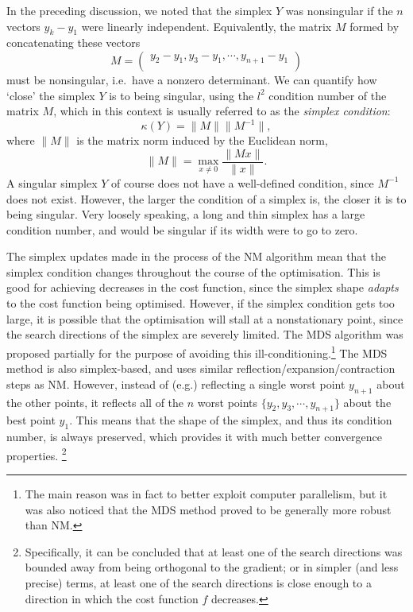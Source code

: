 In the preceding discussion, we noted that the simplex $Y$ was nonsingular if the $n$ vectors $y_k - y_1$ were linearly independent.
Equivalently, the matrix $M$ formed by concatenating these vectors
\begin{equation}
    \label{eq:simplex_matrix}
    M = \begin{pmatrix}
        y_2 - y_1, y_3 - y_1, \cdots, y_{n+1} - y_1 \\
    \end{pmatrix}
\end{equation}
must be nonsingular, i.e.\ have a nonzero determinant.
We can quantify how `close' the simplex $Y$ is to being singular, using the $l^2$ condition number of the matrix $M$, which in this context is usually referred to as the \textit{simplex condition}:
\begin{equation}
    \label{eq:simplex_condition}
    \kappa(Y) = \lVert M \rVert \lVert M^{-1} \rVert,
\end{equation}
where $\lVert M \rVert$ is the matrix norm induced by the Euclidean norm,
\begin{equation}
    \label{eq:matrix_norm}
    \lVert M \rVert = \max_{x \neq 0} \frac{\lVert Mx \rVert}{\lVert x \rVert}.
\end{equation}
A singular simplex $Y$ of course does not have a well-defined condition, since $M^{-1}$ does not exist.
However, the larger the condition of a simplex is, the closer it is to being singular.
Very loosely speaking, a long and thin simplex has a large condition number, and would be singular if its width were to go to zero.

The simplex updates made in the process of the NM algorithm mean that the simplex condition changes throughout the course of the optimisation.
This is good for achieving decreases in the cost function, since the simplex shape \textit{adapts} to the cost function being optimised.
However, if the simplex condition gets too large, it is possible that the optimisation will stall at a nonstationary point, since the search directions of the simplex are severely limited.
The MDS algorithm was proposed partially for the purpose of avoiding this ill-conditioning.\footnote{The main reason was in fact to better exploit computer parallelism, but it was also noticed that the MDS method proved to be generally more robust than NM.}
The MDS method is also simplex-based, and uses similar reflection/expansion/contraction steps as NM.
However, instead of (e.g.) reflecting a single worst point $y_{n+1}$ about the other points, it reflects all of the $n$ worst points $\{y_2, y_3, \cdots, y_{n+1}\}$ about the best point $y_1$.
This means that the shape of the simplex, and thus its condition number, is always preserved, which provides it with much better convergence properties\autocite{Torczon1989,Torczon1991SIAMJO}.%
\footnote{Specifically, it can be concluded that at least one of the search directions was bounded away from being orthogonal to the gradient; or in simpler (and less precise) terms, at least one of the search directions is close enough to a direction in which the cost function $f$ decreases.}

